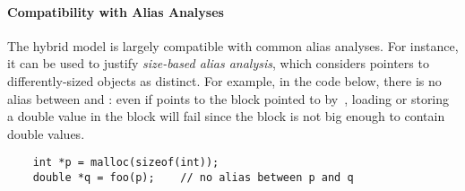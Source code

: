 
\paragraph{Compatibility with Alias Analyses} The hybrid model is largely
compatible with common alias analyses.  For instance, it can be used
to justify \textit{size-based alias analysis}, which considers
pointers to differently-sized objects as distinct. For example, in
the code below, there is no alias between  and :
even if  points to the block
pointed to by~, loading or storing a double value in the
block will fail since the block is not big enough to contain double
values.
\begin{center}
  \begin{verbatim}
    int *p = malloc(sizeof(int));
    double *q = foo(p);    // no alias between p and q
  \end{verbatim}
\end{center}

